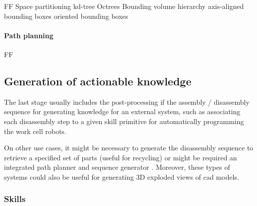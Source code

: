 FF
Space partitioning
	kd-tree
	Octrees
Bounding volume hierarchy
	axis-aligned bounding boxes
	oriented bounding boxes


\paragraph{Path planning}

FF





\subsection{Generation of actionable knowledge}

The last stage usually includes the post-processing if the assembly / disassembly sequence for generating knowledge for an external system, such as associating each disassembly step to a given skill primitive \cite{Thomas2003} for automatically programming the work cell robots.

On other use cases, it might be necessary to generate the disassembly sequence to retrieve a specified set of parts \cite{Smith2012} (useful for recycling) or might be required an integrated path planner and sequence generator \cite{Le2009}. Moreover, these types of systems could also be useful for generating 3D exploded views \cite{Li2008} of \gls{cad} models.



\subsubsection{Skills}

